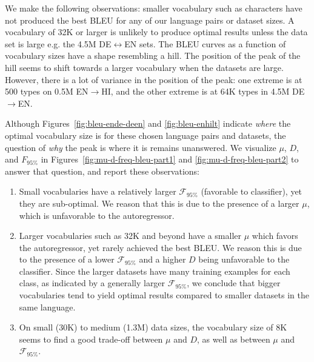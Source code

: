 We make the following observations: smaller vocabulary such as characters have not produced the best BLEU for any of our language pairs or dataset sizes.
A vocabulary of 32K or larger is unlikely to produce optimal results unless the data set is large e.g. the 4.5M DE$\leftrightarrow$EN sets.
The BLEU curves as a function of vocabulary sizes have a shape resembling a hill.
The position of the peak of the hill seems to shift towards a larger vocabulary when the datasets are large.
However, there is a lot of variance in the position of the peak: one extreme is at 500 types on 0.5M EN$\rightarrow$HI, and the other extreme is at 64K types in 4.5M DE$\rightarrow$EN. %

Although Figures~\ref{fig:bleu-ende-deen} and \ref{fig:bleu-enhilt} indicate \textit{where} the optimal vocabulary size is for these chosen language pairs and datasets, the question of \textit{why} the peak is where it is remains unanswered.
We visualize $\mu$, $D$, and $F_{95\%}$ in Figures~\ref{fig:mu-d-freq-bleu-part1} and \ref{fig:mu-d-freq-bleu-part2} to answer that question, and report these observations:
\begin{enumerate}
    \itemsep0em
    \item Small vocabularies have a relatively larger $\mathcal{F}_{95\%}$ (favorable to classifier), yet they are sub-optimal. We reason that this is due to the presence of a larger $\mu$, which is unfavorable to the autoregressor.
    \item Larger vocabularies such as 32K and beyond have a smaller $\mu$ which favors the autoregressor, yet rarely achieved the best BLEU.
    We reason this is due to the presence of a lower $\mathcal{F}_{95\%}$ and a higher $D$ being unfavorable to the classifier.
    Since the larger datasets have many training examples for each class, as indicated by a generally larger $\mathcal{F}_{95\%}$, we conclude that bigger vocabularies tend to yield optimal results compared to smaller datasets in the same language.

    \item On small (30K) to medium (1.3M) data sizes, the vocabulary size of 8K seems to find a good trade-off between $\mu$ and $D$, as well as between $\mu$ and $\mathcal{F}_{95\%}$.%
\end{enumerate}

